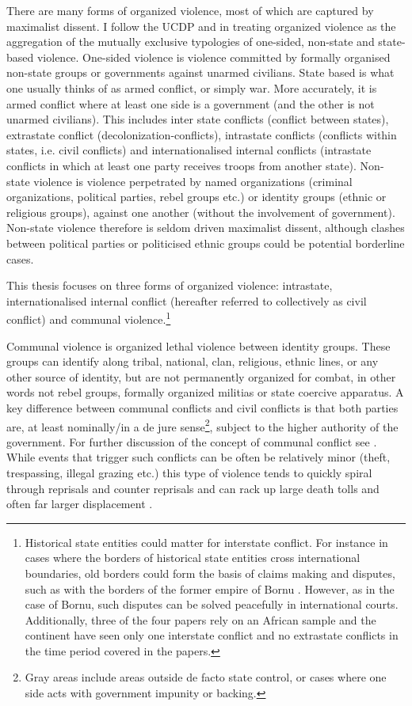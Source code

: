 There are many forms of organized violence, most of which are captured by
maximalist dissent. I follow the UCDP and \citet{Melander_2016} in treating
organized violence as the aggregation of the mutually exclusive typologies of
one-sided, non-state and state-based violence. One-sided violence is violence
committed by formally organised non-state groups or governments against unarmed
civilians. State based is what one usually thinks of as armed conflict, or
simply war. More accurately, it is armed conflict where at least one side is a
government (and the other is not unarmed civilians). This includes inter state
conflicts (conflict between states), extrastate conflict
(decolonization-conflicts), intrastate conflicts (conflicts within states, i.e.
civil conflicts) and internationalised internal conflicts (intrastate conflicts
in which at least one party receives troops from another state). Non-state
violence is violence perpetrated by named organizations (criminal organizations,
political parties, rebel groups etc.) or identity groups (ethnic or religious
groups), against one another (without the involvement of government). Non-state
violence therefore is seldom driven maximalist dissent, although clashes between
political parties or politicised ethnic groups could be potential borderline
cases.

This thesis focuses on three forms of organized violence: intrastate,
internationalised internal conflict (hereafter referred to collectively as civil
conflict) and communal violence.\footnote{Historical state entities could matter
	for interstate conflict. For instance in cases where the borders of
	historical state entities cross international boundaries, old borders
	could form the basis of claims making and disputes, such as with the
	borders of the former empire of Bornu \citep{Hariri2012}. However, as in
	the case of Bornu, such disputes can be solved peacefully in
	international courts. Additionally, three of the four papers rely on an
	African sample and the continent have seen only one interstate conflict
and no extrastate conflicts in the time period covered in the papers.} 

Communal violence is organized lethal violence between identity groups. These
groups can identify along tribal, national, clan, religious, ethnic lines, or
any other source of identity, but are not permanently organized for combat, in
other words not rebel groups, formally organized militias or state coercive
apparatus. A key difference between communal conflicts and civil conflicts is
that both parties are, at least nominally/in a de jure sense\footnote{Gray
        areas include areas outside de facto state control, or cases where one
side acts with government impunity or backing.}, subject to the higher
authority of the government. For further discussion of the concept of communal
conflict see \citet{BroscheJohan2012Cccw}. While events that trigger such
conflicts can be often be relatively minor (theft, trespassing, illegal
grazing etc.) this type of violence tends to quickly spiral through reprisals
and counter reprisals and can rack up large death tolls and often far larger
displacement \citep{Horowitz_2001}. 

